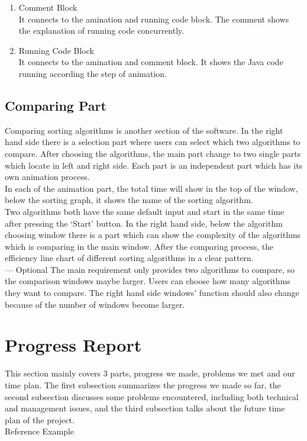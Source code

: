 \documentclass[paper=a4, fontsize=11pt,twoside]{scrartcl}		%
\begin{document}
\begin{enumerate}
\item Comment Block \\It connects to the amination and running code block. The comment shows the explanation of running code concurrently. 

\item Running Code Block \\It connects to the amination and comment block. It shows the Java code running according the step of animation.
\end{enumerate}


\subsection{Comparing Part}

Comparing sorting algorithms is another section of the software. In the right hand side there is a selection part where users can select which two algorithms to compare. After choosing the algorithms, the main part change to two single parts which locate in left and right side. Each part is an independent part which has its own animation process.\\

In each of the animation part, the total time will show in the top of the window, below the sorting graph, it shows the name of the sorting algorithm.\\

Two algorithms both have the same default input and start in the same time after pressing the ‘Start’ button. In the right hand side, below the algorithm choosing window there is a part which can show the complexity of the algorithms which is comparing in the main window. After the comparing process, the efficiency line chart of different sorting algorithms in a clear pattern.\\

— Optional
The main requirement only provides two algorithms to compare, so the comparison windows maybe larger. Users can choose how many algorithms they want to compare. The right hand side windows’ function should also change because of the number of windows become larger.
\clearpage

\section{Progress Report}
This section mainly covers 3 parts, progress we made, problems we met and our time plan. The first subsection summarizes the progress we made so far, the second subsection discusses some problems encountered, including both technical and management issues, and the third subsection talks about the future time plan of the project. \\
Reference Example\cite{Debray:2000:CTC:349214.349233}
\end{document}
